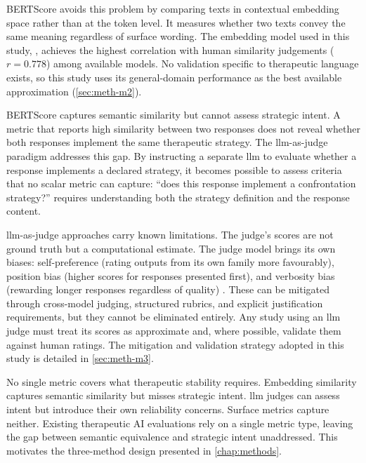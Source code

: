 BERTScore \parencite{PUYCKUYY} avoids this problem by comparing texts in
contextual embedding space rather than at the token level. It measures
whether two texts convey the same meaning regardless of surface wording.
The embedding model used in this study,
 \parencite{8MQC2H2V}, achieves the
highest correlation with human similarity judgements ($r = 0.778$) among
available models. No validation specific to therapeutic language exists,
so this study uses its general-domain performance as the best available
approximation (\autoref{sec:meth-m2}).

BERTScore captures semantic similarity but cannot assess strategic intent.
A metric that reports high similarity between two responses does not reveal
whether both responses implement the same therapeutic strategy. The
\gls{llm}-as-judge paradigm addresses this gap. By instructing a separate
\gls{llm} to evaluate whether a response implements a declared strategy,
it becomes possible to assess criteria that no scalar metric can capture:
``does this response implement a confrontation strategy?'' requires
understanding both the strategy definition and the response content.

\gls{llm}-as-judge approaches carry known limitations. The judge's
scores are not ground truth but a computational estimate. The judge model
brings its own biases: self-preference (rating outputs from its own family
more favourably), position bias (higher scores for responses presented
first), and verbosity bias (rewarding longer responses regardless of
quality) \parencite{LVLA9LZU}. These can be mitigated through cross-model
judging, structured rubrics, and explicit justification requirements, but
they cannot be eliminated entirely. Any study using an \gls{llm} judge
must treat its scores as approximate and, where possible, validate them
against human ratings. The mitigation and validation strategy adopted in
this study is detailed in \autoref{sec:meth-m3}.

No single metric covers what therapeutic stability requires. Embedding
similarity captures semantic similarity but misses strategic intent.
\gls{llm} judges can assess intent but introduce their own reliability
concerns. Surface metrics capture neither. Existing therapeutic AI
evaluations rely on a single metric type, leaving the gap between semantic
equivalence and strategic intent unaddressed. This motivates the
three-method design presented in \autoref{chap:methods}.

